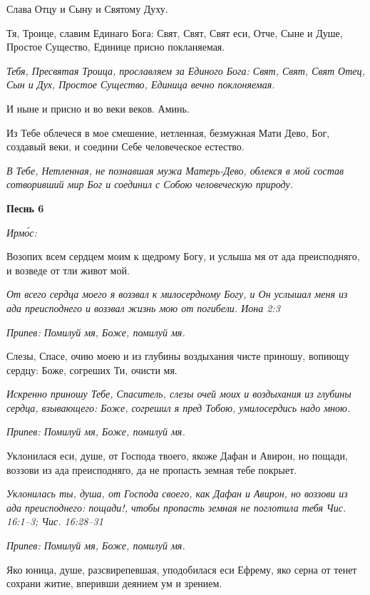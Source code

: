 Слава Отцу и Сыну и Святому Духу.


Тя, Троице, славим Единаго Бога: Свят, Свят, Свят еси, Отче, Сыне и Душе, Простое Существо, Единице присно покланяемая.


\itshape Тебя, Пресвятая Троица, прославляем за Единого Бога: Свят, Свят, Свят Отец, Сын и Дух, Простое Существо, Единица вечно поклоняемая.\normalfont{}


И ныне и присно и во веки веков. Аминь.


Из Тебе облечеся в мое смешение, нетленная, безмужная Мати Дево, Бог, создавый веки, и соедини Себе человеческое естество.


\itshape В Тебе, Нетленная, не познавшая мужа Матерь-Дево, облекся в мой состав сотворивший мир Бог и соединил с Собою человеческую природу.\normalfont{}





\bfseries Песнь 6\normalfont{}


\itshape Ирмо́с:\normalfont{}


Возопих всем сердцем моим к щедрому Богу, и услыша мя от ада преисподняго, и возведе от тли живот мой.


\itshape От всего сердца моего я воззвал к милосердному Богу, и Он услышал меня из ада преисподнего и воззвал жизнь мою от погибели. Иона 2:3\normalfont{}


\itshape Припев:\normalfont{} Помилуй мя, Боже, помилуй мя.


Слезы, Спасе, очию моею и из глубины воздыхания чисте приношу, вопиющу сердцу: Боже, согреших Ти, очисти мя.


\itshape Искренно приношу Тебе, Спаситель, слезы очей моих и воздыхания из глубины сердца, взывающего: Боже, согрешил я пред Тобою, умилосердись надо мною.\normalfont{}


\itshape Припев:\normalfont{} Помилуй мя, Боже, помилуй мя.


Уклонилася еси, душе, от Господа твоего, якоже Дафан и Авирон, но пощади, воззови из ада преисподняго, да не пропасть земная тебе покрыет.


\itshape Уклонилась ты, душа, от Господа своего, как Дафан и Авирон, но воззови из ада преисподнего: пощади!, чтобы пропасть земная не поглотила тебя Чис. 16:1–3; Чис. 16:28–31\normalfont{}


\itshape Припев:\normalfont{} Помилуй мя, Боже, помилуй мя.


Яко юница, душе, разсвирепевшая, уподобилася еси Ефрему, яко серна от тенет сохрани житие, вперивши деянием ум и зрением.


